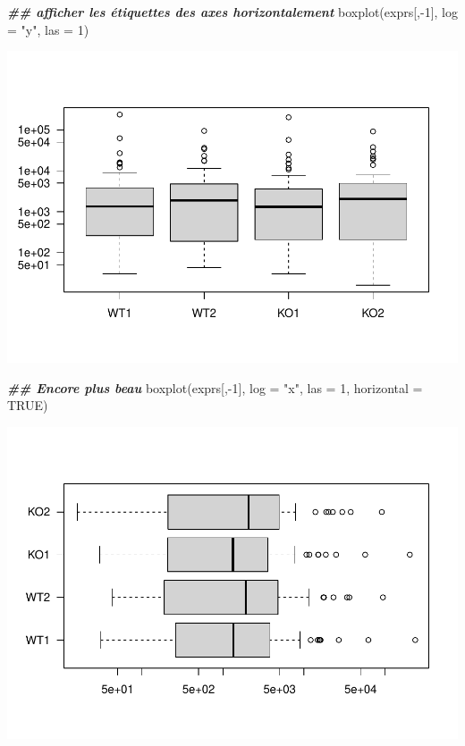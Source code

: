 \documentclass[
]{book}
\newenvironment{Shaded}{\begin{snugshade}}{\end{snugshade}}
\newcommand{\AttributeTok}[1]{\textcolor[rgb]{0.77,0.63,0.00}{#1}}
\newcommand{\ConstantTok}[1]{\textcolor[rgb]{0.00,0.00,0.00}{#1}}
\newcommand{\DecValTok}[1]{\textcolor[rgb]{0.00,0.00,0.81}{#1}}
\newcommand{\DocumentationTok}[1]{\textcolor[rgb]{0.56,0.35,0.01}{\textbf{\textit{#1}}}}
\newcommand{\FunctionTok}[1]{\textcolor[rgb]{0.00,0.00,0.00}{#1}}
\newcommand{\NormalTok}[1]{#1}
\newcommand{\SpecialCharTok}[1]{\textcolor[rgb]{0.00,0.00,0.00}{#1}}
\newcommand{\StringTok}[1]{\textcolor[rgb]{0.31,0.60,0.02}{#1}}
\begin{document}
\begin{Shaded}
\begin{Highlighting}[]
\DocumentationTok{\#\# afficher les étiquettes des axes horizontalement}
\FunctionTok{boxplot}\NormalTok{(exprs[,}\SpecialCharTok{{-}}\DecValTok{1}\NormalTok{], }\AttributeTok{log =} \StringTok{"y"}\NormalTok{, }\AttributeTok{las =} \DecValTok{1}\NormalTok{) }
\end{Highlighting}
\end{Shaded}

\includegraphics{images/unnamed-chunk-84-1.pdf}

\begin{Shaded}
\begin{Highlighting}[]
\DocumentationTok{\#\# Encore plus beau}
\FunctionTok{boxplot}\NormalTok{(exprs[,}\SpecialCharTok{{-}}\DecValTok{1}\NormalTok{], }\AttributeTok{log =} \StringTok{"x"}\NormalTok{, }\AttributeTok{las =} \DecValTok{1}\NormalTok{, }\AttributeTok{horizontal =} \ConstantTok{TRUE}\NormalTok{) }
\end{Highlighting}
\end{Shaded}

\includegraphics{images/unnamed-chunk-85-1.pdf}
\end{document}
